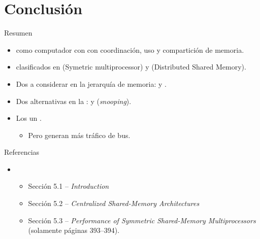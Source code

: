 \section{Conclusión}

\begin{frame}[t]{Resumen}
\begin{itemize}
  \item {} como computador con 
        con coordinación, uso y compartición de memoria.

  \item {} clasificados en 
         (Symetric multiprocessor) y
         (Distributed Shared Memory).

  \item Dos  a considerar en la jerarquía de memoria: 
         y .

  \item Dos alternativas en la : 
         y  (\emph{snooping}).

  \item Los   un 
        .
    \begin{itemize}
      \item Pero generan más tráfico de bus.
    \end{itemize}
\end{itemize}
\end{frame}

\begin{frame}[t]{Referencias}
\begin{itemize}
  \item \bibhennessy
    \begin{itemize}
      \item Sección 5.1 -- \emph{Introduction}
      \item Sección 5.2 -- \emph{Centralized Shared-Memory Architectures}
      \item Sección 5.3 -- \emph{Performance of Symmetric Shared-Memory Multiprocessors}
            (solamente páginas 393--394).
    \end{itemize}

\end{itemize}
\end{frame}
